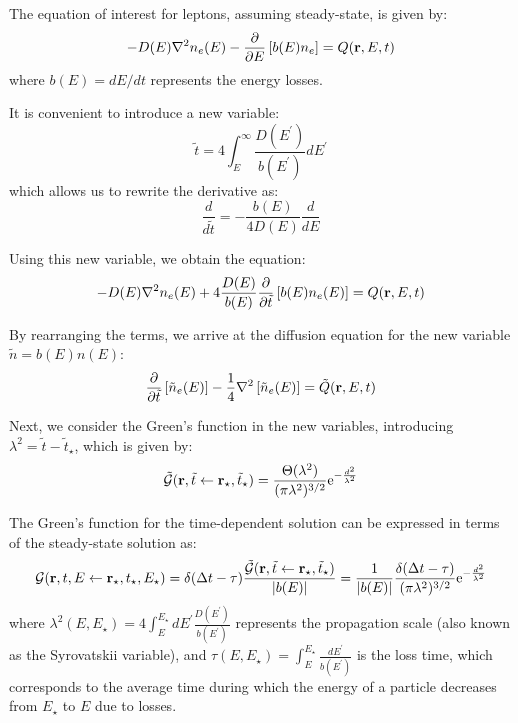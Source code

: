 The equation of interest for leptons, assuming steady-state, is given by:
%
\begin{equation}
- D(E) \nabla^2 n_e(E)
- \frac{\partial}{\partial E} \left[ b(E) n_e \right] 
= Q(\vb r, E, t)
\end{equation}
%
where $b(E) = dE/dt$ represents the energy losses.

It is convenient to introduce a new variable:
%
\begin{equation}
\tilde t = 4 \int_E^\infty \frac{D(E^\prime)}{b(E^\prime)} dE^\prime
\end{equation}
%
which allows us to rewrite the derivative as:
%
\begin{equation}
\frac{d}{d\tilde t} = - \frac{b(E)}{4 D(E)} \frac{d}{dE}
\end{equation}

Using this new variable, we obtain the equation:
%
\begin{equation}
- D(E) \nabla^2 n_e(E)
+ 4 \frac{D(E)}{b(E)}\frac{\partial}{\partial \tilde t} \left[ b(E) n_e(E) \right] 
= Q(\vb r, E, t)
\end{equation} 

By rearranging the terms, we arrive at the diffusion equation for the new variable $\tilde{n} = b(E) n(E)$:
%
\begin{equation}
\frac{\partial}{\partial \tilde t} \left[ \tilde n_e(E) \right] 
- \frac{1}{4} \nabla^2 \left[ \tilde n_e(E) \right]
= \tilde Q(\vb r, E, t)
\end{equation} 

Next, we consider the Green's function in the new variables, introducing $\lambda^2 = \tilde{t} - \tilde{t}_\star$, which is given by:
%
\begin{equation}
\tilde{\mathcal G} (\vb r, \tilde t \leftarrow \vb r_\star, \tilde t_\star) 
= \frac{\Theta(\lambda^2)}{(\pi \lambda^2)^{3/2}} 
{\rm e}^{-\frac{d^2}{\lambda^2}}
\end{equation}

The Green's function for the time-dependent solution can be expressed in terms of the steady-state solution as:
%
\begin{equation}
{\mathcal G} (\vb r, t, E \leftarrow \vb r_\star, t_\star, E_\star) 
= \delta(\Delta t - \tau) \frac{\tilde{\mathcal G} (\vb r, \tilde t \leftarrow \vb r_\star, \tilde t_\star)}{|b(E)|} 
= \frac{1}{|b(E)|}\frac{\delta(\Delta t - \tau)}{(\pi \lambda^2)^{3/2}} {\rm e}^{-\frac{d^2}{\lambda^2}}
\end{equation}
%
where $\lambda^2(E, E_\star) = 4 \int_{E}^{E_\star} dE^\prime \frac{D(E^\prime)}{b(E^\prime)}$ represents the propagation scale (also known as the Syrovatskii variable), and $\tau(E, E_\star) = \int_E^{E_\star} \frac{dE^\prime}{b(E^\prime)}$ is the loss time, which corresponds to the average time during which the energy of a particle decreases from $E_\star$ to $E$ due to losses.

